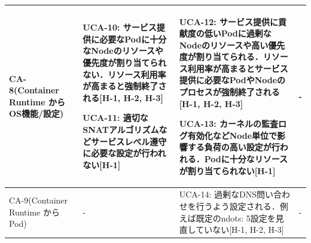 \documentclass[12pt,a4j]{ujreport}
\begin{document}
\begin{footnotesize}
\begin{tabularx}{\linewidth}{
            >{\hsize=0.7\hsize}X|
            >{\hsize=1.1\hsize}X|
            >{\hsize=1.1\hsize}X|
            >{\hsize=1.1\hsize}X
        }
        CA-8(Container Runtime から OS機能/設定)                      & UCA-10: サービス提供に必要なPodに十分なNodeのリソースや優先度が割り当てられない．リソース利用率が高まると強制終了される[H-1, H-2, H-3]\par\noindent UCA-11: 適切なSNATアルゴリズムなどサービスレベル遵守に必要な設定が行われない[H-1]                                                                                                                                                                                                                                                                      & UCA-12: サービス提供に貢献度の低いPodに過剰なNodeのリソースや高い優先度が割り当てられる．リソース利用率が高まるとサービス提供に必要なPodやNodeのプロセスが強制終了される[H-1, H-2, H-3]\par\noindent UCA-13: カーネルの監査ログ有効化などNode単位で影響する負荷の高い設定が行われる．Podに十分なリソースが割り当てられない[H-1] & -                                                                                                                                    \\ \hline
        CA-9(Container Runtime から Pod)                              & -                                                                                                                                                                                                                                                                                                                                                                                                                                                                                                          & UCA-14: 過剰なDNS問い合わせを行うよう設定される．例えば既定のndots: 5設定を見直していない[H-1, H-2, H-3]                                                                                                                                                                                                                        & -                                                                                                                                    \\ \hline

\end{tabularx}
\end{footnotesize}
\end{document}
